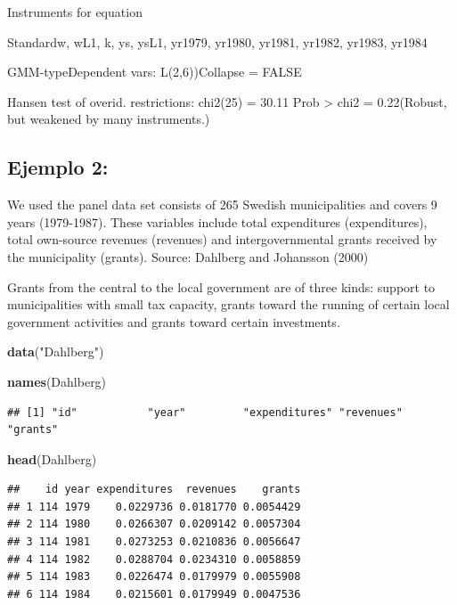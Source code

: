 \documentclass[
]{book}
\newenvironment{Shaded}{\begin{snugshade}}{\end{snugshade}}
\newcommand{\FunctionTok}[1]{\textcolor[rgb]{0.13,0.29,0.53}{\textbf{#1}}}
\newcommand{\NormalTok}[1]{#1}
\newcommand{\StringTok}[1]{\textcolor[rgb]{0.31,0.60,0.02}{#1}}
\begin{document}
Instruments for equation

Standardw, wL1, k, ys, ysL1, yr1979, yr1980, yr1981, yr1982, yr1983, yr1984

GMM-typeDependent vars: L(2,6))Collapse = FALSE

Hansen test of overid. restrictions: chi2(25) = 30.11 Prob \textgreater{} chi2 = 0.22(Robust, but weakened by many instruments.)

\hypertarget{ejemplo-2}{%
\subsection{Ejemplo 2:}\label{ejemplo-2}}

We used the panel data set consists of 265 Swedish municipalities and covers 9 years (1979-1987).
These variables include total expenditures (expenditures), total own-source revenues (revenues) and intergovernmental grants received by the municipality (grants).
Source: Dahlberg and Johansson (2000)

Grants from the central to the local government are of three kinds: support to municipalities with small tax capacity, grants toward the running of certain local government activities and grants toward certain investments.

\begin{Shaded}
\begin{Highlighting}[]
\FunctionTok{data}\NormalTok{(}\StringTok{"Dahlberg"}\NormalTok{)}

\FunctionTok{names}\NormalTok{(Dahlberg)}
\end{Highlighting}
\end{Shaded}

\begin{verbatim}
## [1] "id"           "year"         "expenditures" "revenues"     "grants"
\end{verbatim}

\begin{Shaded}
\begin{Highlighting}[]
\FunctionTok{head}\NormalTok{(Dahlberg)}
\end{Highlighting}
\end{Shaded}

\begin{verbatim}
##    id year expenditures  revenues    grants
## 1 114 1979    0.0229736 0.0181770 0.0054429
## 2 114 1980    0.0266307 0.0209142 0.0057304
## 3 114 1981    0.0273253 0.0210836 0.0056647
## 4 114 1982    0.0288704 0.0234310 0.0058859
## 5 114 1983    0.0226474 0.0179979 0.0055908
## 6 114 1984    0.0215601 0.0179949 0.0047536
\end{verbatim}
\end{document}
